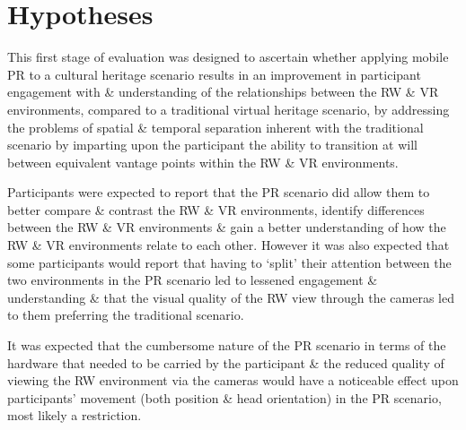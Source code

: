 	
	
	
	


\section{Hypotheses}

This first stage of evaluation was designed to ascertain whether applying mobile PR to a cultural heritage scenario results in an improvement in participant engagement with \& understanding of the relationships between the RW \& VR environments, compared to a traditional virtual heritage scenario, by addressing the problems of spatial \& temporal separation inherent with the traditional scenario by imparting upon the participant the ability to transition at will between equivalent vantage points within the RW \& VR environments.

Participants were expected to report that the PR scenario did allow them to better compare \& contrast the RW \& VR environments, identify differences between the RW \& VR environments \& gain a better understanding of how the RW \& VR environments relate to each other. However it was also expected that some participants would report that having to `split' their attention between the two environments in the PR scenario led to lessened engagement \& understanding \& that the visual quality of the RW view through the cameras led to them preferring the traditional scenario.

It was expected that the cumbersome nature of the PR scenario in terms of the hardware that needed to be carried by the participant \& the reduced quality of viewing the RW environment via the cameras would have a noticeable effect upon participants' movement (both position \& head orientation) in the PR scenario, most likely a restriction.

